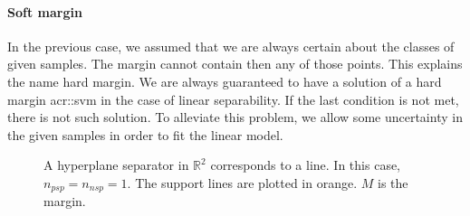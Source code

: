             \paragraph{Soft margin}
                In the previous case, we assumed that we are always certain about the classes of given samples.
                The margin cannot contain then any of those points.
                This explains the name hard margin.
                We are always guaranteed to have a solution of a hard margin \gls{acr::svm} in the case of linear separability.
                If the last condition is not met, there is not such solution.
                To alleviate this problem, we allow some uncertainty in the given samples in order to fit the linear model.\\

                \begin{figure}
                    \centering
                    
                    \caption{
                        \label{fig::soft_margin} A hyperplane separator in $\mathbb{R}^2$ corresponds to a line.
                        In this case, $n_{psp} = n_{nsp} = 1$.
                        The support lines are plotted in orange.
                        $M$ is the margin.
                    }
                \end{figure}

